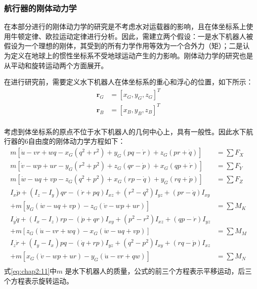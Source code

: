 \subsubsection{航行器的刚体动力学 }

在本部分进行的刚体动力学的研究是不考虑水对运载器的影响，且在体坐标系上使用牛顿定律、欧拉运动定律进行分析。因此，需建立两个假设：一是水下机器人被假设为一个理想的刚体，其受到的所有力学作用等效为一个合外力（矩）；二是认为定义在地球上的惯性坐标系不受地球运动产生的力影响\cite{prestero2001verification}。刚体动力学的研究也是从平动和旋转运动两个方面展开。

在进行研究前，需要定义水下机器人在体坐标系的重心和浮心的位置，如下所示：
\begin{equation}
\label{eq:chap2:10}
\begin{aligned}
{\bm{r}}_{G} &= [ x_G,  y_G,  z_G ]^T  \\
{\bm{r}}_{B} &= [ x_B,  y_B,  z_B ]^T  \\
\end{aligned}
\end{equation}

考虑到体坐标系的原点不位于水下机器人的几何中心上，具有一般性。因此水下航行器的6自由度的刚体动力学方程如下：
\begin{equation}
\label{eq:chap2:11}
 \begin{aligned}
 m\left[ {\dot u - vr + wq - {x_G}({q^2} + {r^2}) + {y_G}(pq - \dot r) + {z_G}(pr + \dot q)} \right] &= \sum {{F_X}}  \\
 m\left[ {\dot v - wp + ur - {y_G}({r^2} + {p^2}) + {z_G}(qr - \dot p) + {x_G}(qp + \dot r)} \right] &= \sum {{F_Y}}  \\
 m\left[ {\dot w - uq + vp - {z_G}({q^2} + {p^2}) + {x_G}(rp - \dot q) + {y_G}(rq + \dot p)} \right] &= \sum {{F_Z}}  \\
 {I_x}\dot p + ({I_z} - {I_y})qr -(\dot r + pq)I_{xz}+(r^2-q^2)I_{yz}+(pr-\dot q)I_{xy}\\
               + m[{y_G}(\dot w - uq + vp) - {z_G}(\dot v - wp + ur)] &= \sum {{M_K}}  \\
 {I_y}\dot q + ({I_x} - {I_z})rp -(\dot p + qr)I_{xy}+(p^2-r^2)I_{xz}+(qp-\dot r)I_{yz}\\
               + m[{z_G}(\dot u - vr + wq) - {x_G}(\dot w - uq + vp)] &= \sum {{M_M}}  \\
 {I_z}\dot r + ({I_y} - {I_x})pq -(\dot q + rp)I_{yz}+(q^2-p^2)I_{xy}+(rq-\dot p)I_{xz}\\
               + m[{x_G}(\dot v - wp + ur) - {y_G}(\dot u - vr + qw)] &= \sum {{M_N}}  \\
 \end{aligned}
 \end{equation}
式\ref{eq:chap2:11}中$m$ 是水下机器人的质量，公式的前三个方程表示平移运动，后三个方程表示旋转运动。

